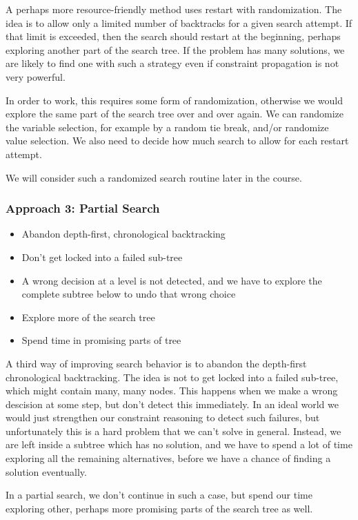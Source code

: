 A perhaps more resource-friendly method uses restart with randomization. The idea is to allow only a limited number of backtracks for a given search attempt. If that limit is exceeded, then the search should restart at the beginning, perhaps exploring another part of the search tree. If the problem has many solutions, we are likely to find one with such a strategy even if constraint propagation is not very powerful. 

In order to work, this requires some form of randomization, otherwise we would explore the same part of the search tree over and over again. We can randomize the variable selection, for example by a random tie break, and/or randomize value selection. We also need to decide how much search to allow for each restart attempt.

We will consider such a randomized search routine later in the course.

\begin{frame}
\frametitle{Approach 3: Partial Search}
\begin{itemize}
\item Abandon depth-first, chronological backtracking
\item Don't get locked into a failed sub-tree
\item A wrong decision at a level is not detected, and we have to explore the complete subtree below to undo that wrong choice
\item Explore more of the search tree
\item Spend time in promising parts of tree
\end{itemize}
\end{frame}

A third way of improving search behavior is to abandon the depth-first chronological backtracking. The idea is not to get locked into a failed sub-tree, which might contain many, many nodes. This happens when we make a wrong descision at some step, but don't detect this immediately. In an ideal world we would just strengthen our constraint reasoning to detect such failures, but unfortunately this is a hard problem that we can't solve in general. Instead, we are left inside a subtree which has no solution, and we have to spend a lot of time exploring all the remaining alternatives, before we have a chance of finding a solution eventually.

In a partial search, we don't continue in such a case, but spend our time exploring other, perhaps more promising parts of the search tree as well.

